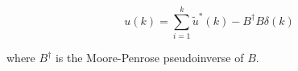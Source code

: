 \begin{equation}
	u(k) = \sum_{i=1}^{k} \tilde{u}^*(k) - B^\dagger B\delta(k)
\end{equation}

where $B^\dagger$ is the Moore-Penrose pseudoinverse of $B$.







